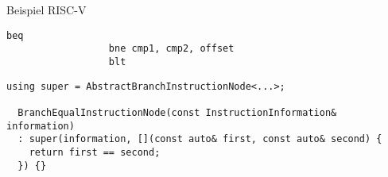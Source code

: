 \begin{frame}[fragile]{Beispiel RISC-V}
\vspace{-0.75cm}
\begin{lstlisting}[style=risc-v_Assembler, basicstyle=\ttfamily\large]
                  beq
                  bne cmp1, cmp2, offset
                  blt
\end{lstlisting}
\vspace{0.4cm}

\pause
\begin{lstlisting}[style=C++]
  using super = AbstractBranchInstructionNode<...>;

  BranchEqualInstructionNode(const InstructionInformation& information)
  : super(information, [](const auto& first, const auto& second) {
    return first == second;
  }) {}
\end{lstlisting}
\end{frame}
